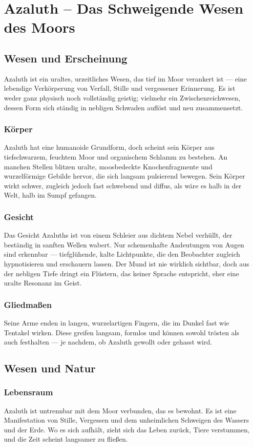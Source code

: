 \section{Azaluth – Das Schweigende Wesen des Moors}
\subsection{Wesen und Erscheinung}
Azaluth ist ein uraltes, urzeitliches Wesen, das tief im Moor verankert ist — eine lebendige Verkörperung von Verfall, Stille und vergessener Erinnerung. Es ist weder ganz physisch noch vollständig geistig; vielmehr ein Zwischenreichwesen, dessen Form sich ständig in nebligen Schwaden auflöst und neu zusammensetzt.
\subsubsection*{Körper}
Azaluth hat eine humanoide Grundform, doch scheint sein Körper aus tiefschwarzem, feuchtem Moor und organischem Schlamm zu bestehen. An manchen Stellen blitzen uralte, moosbedeckte Knochenfragmente und wurzelförmige Gebilde hervor, die sich langsam pulsierend bewegen. Sein Körper wirkt schwer, zugleich jedoch fast schwebend und diffus, als wäre es halb in der Welt, halb im Sumpf gefangen.
\subsubsection*{Gesicht}
Das Gesicht Azaluths ist von einem Schleier aus dichtem Nebel verhüllt, der beständig in sanften Wellen wabert. Nur schemenhafte Andeutungen von Augen sind erkennbar — tiefglühende, kalte Lichtpunkte, die den Beobachter zugleich hypnotisieren und erschauern lassen. Der Mund ist nie wirklich sichtbar, doch aus der nebligen Tiefe dringt ein Flüstern, das keiner Sprache entspricht, eher eine uralte Resonanz im Geist.
\subsubsection*{Gliedmaßen}
Seine Arme enden in langen, wurzelartigen Fingern, die im Dunkel fast wie Tentakel wirken. Diese greifen langsam, formlos und können sowohl trösten als auch festhalten — je nachdem, ob Azaluth gewollt oder gehasst wird.
\subsection{Wesen und Natur}
\subsubsection*{Lebensraum}
Azaluth ist untrennbar mit dem Moor verbunden, das es bewohnt. Es ist eine Manifestation von Stille, Vergessen und dem unheimlichen Schweigen des Wassers und der Erde. Wo es sich aufhält, zieht sich das Leben zurück, Tiere verstummen, und die Zeit scheint langsamer zu fließen.
